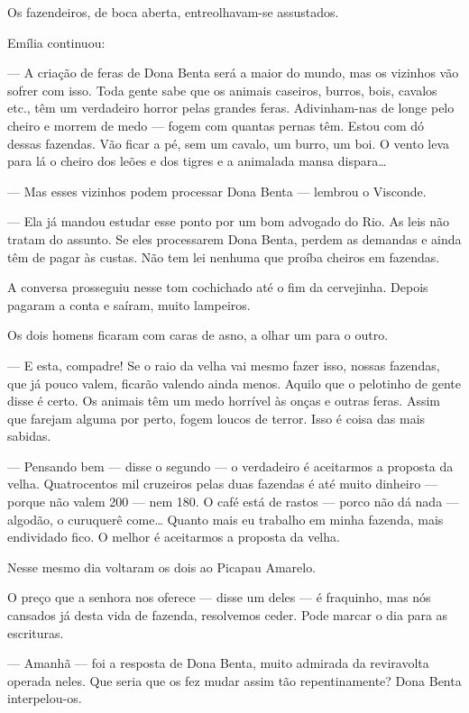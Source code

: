 Os fazendeiros, de boca aberta, entreolhavam-se assustados.

Emília continuou:

--- A criação de feras de Dona Benta será a maior do mundo, mas os
vizinhos vão sofrer com isso. Toda gente sabe que os animais caseiros,
burros, bois, cavalos etc., têm um verdadeiro horror pelas grandes
feras. Adivinham-nas de longe pelo cheiro e morrem de medo --- fogem com
quantas pernas têm. Estou com dó dessas fazendas. Vão ficar a pé, sem um
cavalo, um burro, um boi. O vento leva para lá o cheiro dos leões e dos
tigres e a animalada mansa dispara\ldots{}

--- Mas esses vizinhos podem processar Dona Benta --- lembrou o
Visconde.

--- Ela já mandou estudar esse ponto por um bom advogado do Rio. As leis
não tratam do assunto. Se eles processarem Dona Benta, perdem as
demandas e ainda têm de pagar às custas. Não tem lei nenhuma que proíba
cheiros em fazendas.

A conversa prosseguiu nesse tom cochichado até o fim da cervejinha.
Depois pagaram a conta e saíram, muito lampeiros.

Os dois homens ficaram com caras de asno, a olhar um para o outro.

--- E esta, compadre! Se o raio da velha vai mesmo fazer isso, nossas
fazendas, que já pouco valem, ficarão valendo ainda menos. Aquilo que o
pelotinho de gente disse é certo. Os animais têm um medo horrível às
onças e outras feras. Assim que farejam alguma por perto, fogem loucos
de terror. Isso é coisa das mais sabidas.

--- Pensando bem --- disse o segundo --- o verdadeiro é aceitarmos a
proposta da velha. Quatrocentos mil cruzeiros pelas duas fazendas é até
muito dinheiro --- porque não valem 200 --- nem 180. O café está de
rastos --- porco não dá nada --- algodão, o curuquerê come\ldots{}
Quanto mais eu trabalho em minha fazenda, mais endividado fico. O melhor
é aceitarmos a proposta da velha.

Nesse mesmo dia voltaram os dois ao Picapau Amarelo.

O preço que a senhora nos oferece --- disse um deles --- é fraquinho,
mas nós cansados já desta vida de fazenda, resolvemos ceder. Pode marcar
o dia para as escrituras.

--- Amanhã --- foi a resposta de Dona Benta, muito admirada da
reviravolta operada neles. Que seria que os fez mudar assim tão
repentinamente? Dona Benta interpelou-os.

